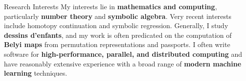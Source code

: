 \begin{rSection}{Research Interests}
My interests lie in \textbf{mathematics and computing}, particularly \textbf{number theory} and \textbf{symbolic algebra}. Very recent interests include homotopy continuation and symbolic regression.
Generally, I study \textbf{dessins d'enfants}, and my work is often predicated on the computation of \textbf{Belyi maps} from permutation representations and passports. I often write software for \textbf{high-performance, parallel, and distributed computing} and have reasonably extensive experience with a broad range of \textbf{modern machine learning} techniques.
\end{rSection}